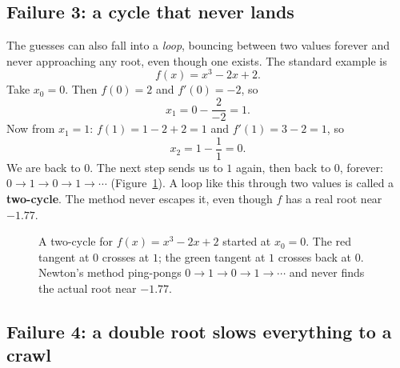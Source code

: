 \subsection{Failure 3: a cycle that never lands}

The guesses can also fall into a \emph{loop}, bouncing between two values forever
and never approaching any root, even though one exists. The standard example is
\[
  f(x) = x^3 - 2x + 2.
\]
Take $x_0 = 0$. Then $f(0) = 2$ and $f'(0) = -2$, so
\[
  x_1 = 0 - \frac{2}{-2} = 1.
\]
Now from $x_1 = 1$: $f(1) = 1 - 2 + 2 = 1$ and $f'(1) = 3 - 2 = 1$, so
\[
  x_2 = 1 - \frac{1}{1} = 0.
\]
We are back to $0$. The next step sends us to $1$ again, then back to $0$, forever:
$0 \to 1 \to 0 \to 1 \to \cdots$ (Figure~\ref{ch19:fig-cycle}). A loop like this
through two values is called a \textbf{two-cycle}. The method never escapes it,
even though $f$ has a real root near $-1.77$.

\begin{figure}[H]
\centering
{}
\caption{A two-cycle for $f(x)=x^3-2x+2$ started at $x_0=0$. The red tangent at
$0$ crosses at $1$; the green tangent at $1$ crosses back at $0$. Newton's method
ping-pongs $0\to1\to0\to1\to\cdots$ and never finds the actual root near $-1.77$.}
\label{ch19:fig-cycle}
\end{figure}

\subsection{Failure 4: a double root slows everything to a crawl}

